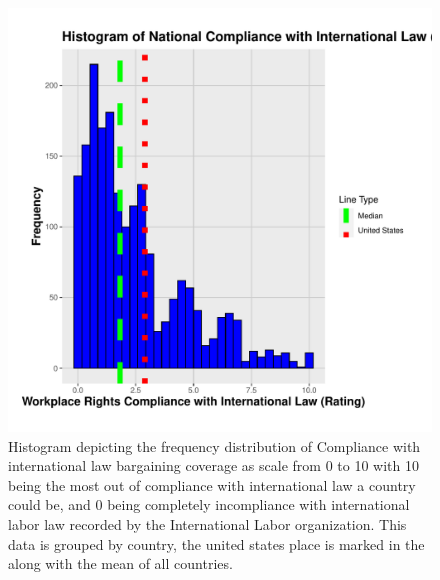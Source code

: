 \documentclass[11pt]{article}\usepackage[]{graphicx}\usepackage[]{xcolor}
\newenvironment{knitrout}{}{} %
\begin{document}
\begin{figure}[h]
\centering
  \begin{minipage}{0.7\linewidth}
\begin{knitrout}
\color{fgcolor}

{\centering \includegraphics[width=0.7\linewidth]{figure/WorkplaceRights-1} 

}


\end{knitrout}
  \caption{Histogram depicting the frequency distribution of Compliance with international law bargaining coverage as scale from 0 to 10 with 10 being the most out of compliance with international law a country could be, and 0 being completely incompliance with international labor law recorded by the International Labor organization. This data is grouped by country, the united states place is marked in the along with the mean of all countries.}
  \label{fig:2.3}
  \end{minipage}
\end{figure}
\end{document}
